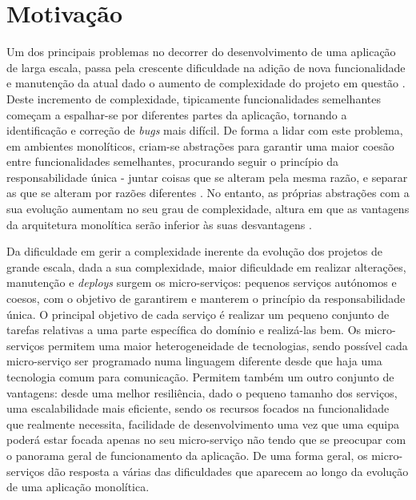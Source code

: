 \section{Motivação}

    Um dos principais problemas no decorrer do desenvolvimento de uma aplicação de larga escala, passa pela crescente dificuldade na adição de nova funcionalidade e manutenção da atual dado o aumento de complexidade do projeto em questão \citep{buildingmaintainablesoftware2016}. Deste incremento de complexidade, tipicamente funcionalidades semelhantes começam a espalhar-se por diferentes partes da aplicação, tornando a identificação e correção de \textit{bugs} mais difícil. De forma a lidar com este problema, em ambientes monolíticos, criam-se abstrações para garantir uma maior coesão entre funcionalidades semelhantes, procurando seguir o princípio da responsabilidade única - juntar coisas que se alteram pela mesma razão, e separar as que se alteram por razões diferentes \citep{newman2015microservices}. No entanto, as próprias abstrações com a sua evolução aumentam no seu grau de complexidade, altura em que as vantagens da arquitetura monolítica serão inferior às suas desvantagens \citep{monolithtomicroserviceschen17}. 
    
    Da dificuldade em gerir a complexidade inerente da evolução dos projetos de grande escala, dada a sua complexidade, maior dificuldade em realizar alterações, manutenção e \textit{deploys} surgem os micro-serviços: pequenos serviços autónomos e coesos, com o objetivo de garantirem e manterem o princípio da responsabilidade única. O principal objetivo de cada serviço é realizar um pequeno conjunto de tarefas relativas a uma parte específica do domínio e realizá-las bem. Os micro-serviços permitem uma maior heterogeneidade de tecnologias, sendo possível cada micro-serviço ser programado numa linguagem diferente desde que haja uma tecnologia comum para comunicação. Permitem também um outro conjunto de vantagens: desde uma melhor resiliência, dado o pequeno tamanho dos serviços, uma escalabilidade mais eficiente, sendo os recursos focados na funcionalidade que realmente necessita, facilidade de desenvolvimento uma vez que uma equipa poderá estar focada apenas no seu micro-serviço não tendo que se preocupar com o panorama geral de funcionamento da aplicação. De uma forma geral, os micro-serviços dão resposta a várias das dificuldades que aparecem ao longo da evolução de uma aplicação monolítica.
    


